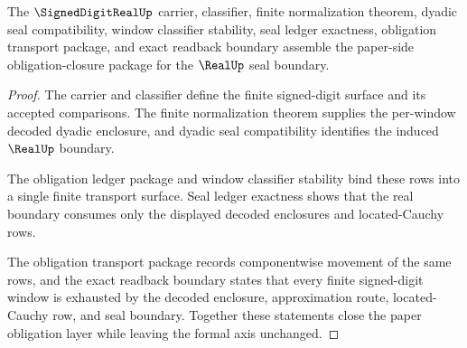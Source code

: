 \begin{theorem}
\label{thm:signed-digit-real-obligation-closure-package}
The $\SignedDigitRealUp$ carrier, classifier, finite normalization theorem,
dyadic seal compatibility, window classifier stability, seal ledger exactness,
obligation transport package, and exact readback boundary assemble the
paper-side obligation-closure package for the $\RealUp$ seal boundary.
\end{theorem}
\begin{proof}
The carrier and classifier define the finite signed-digit surface and its
accepted comparisons. The finite normalization theorem supplies the per-window
decoded dyadic enclosure, and dyadic seal compatibility identifies the induced
$\RealUp$ boundary.

The obligation ledger package and window classifier stability bind these rows
into a single finite transport surface. Seal ledger exactness shows that the
real boundary consumes only the displayed decoded enclosures and located-Cauchy
rows.

The obligation transport package records componentwise movement of the same
rows, and the exact readback boundary states that every finite signed-digit
window is exhausted by the decoded enclosure, approximation route,
located-Cauchy row, and seal boundary. Together these statements close the
paper obligation layer while leaving the formal axis unchanged.
\end{proof}

